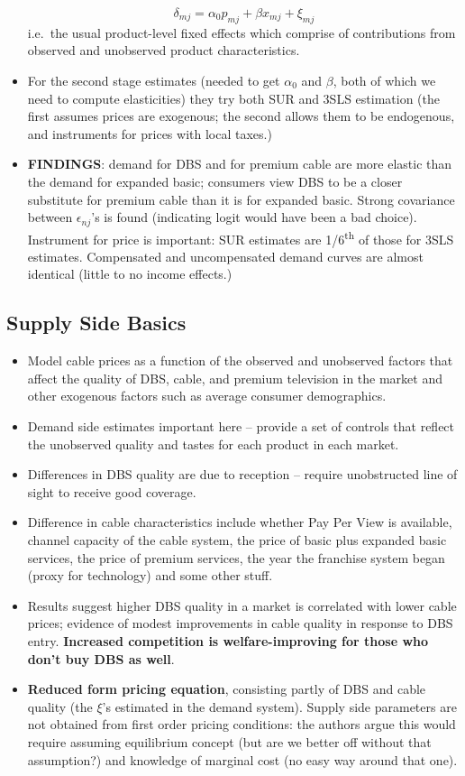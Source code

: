 \documentclass[11pt]{article}
\begin{document}
\begin{itemize}
		\begin{equation}
		\delta_{mj} = \alpha_0 p_{mj} +\beta x_{mj} + \xi_{mj}
		\end{equation}
		i.e.\ the usual product-level fixed effects which comprise of contributions from observed and unobserved product characteristics.
		\item For the second stage estimates (needed to get $\alpha_0$ and $\beta$, both of which we need to compute elasticities) they try both SUR and 3SLS estimation (the first assumes prices are exogenous; the second allows them to be endogenous, and instruments for prices with local taxes.)
		\item \textbf{FINDINGS}: demand for DBS and for premium cable are more elastic than the demand for expanded basic; consumers view DBS to be a closer substitute for premium cable than it is for expanded basic. Strong covariance between $\epsilon_{nj}$'s is found (indicating logit would have been a bad choice). Instrument for price is important: SUR estimates are 1/6\textsuperscript{th} of those for 3SLS estimates. Compensated and uncompensated demand curves are almost identical (little to no income effects.)
	\end{itemize}
\subsection{Supply Side Basics}
	\begin{itemize}
		\item Model cable prices as a function of the observed and unobserved factors that affect the quality of DBS, cable, and premium television in the market and other exogenous factors such as average consumer demographics.
		\item Demand side estimates important here -- provide a set of controls that reflect the unobserved quality and tastes for each product in each market.
		\item Differences in DBS quality are due to reception -- require unobstructed line of sight to receive good coverage.
		\item Difference in cable characteristics include whether Pay Per View is available, channel capacity of the cable system, the price of basic plus expanded basic services, the price of premium services, the year the franchise system began (proxy for technology) and some other stuff.
		\item Results suggest higher DBS quality in a market is correlated with lower cable prices; evidence of modest improvements in cable quality in response to DBS entry. \textbf{Increased competition is welfare-improving for those who don't buy DBS as well}.
		\item \textbf{Reduced form pricing equation}, consisting partly of DBS and cable quality (the $\xi$'s estimated in the demand system). Supply side parameters are not obtained from first order pricing conditions: the authors argue this would require assuming equilibrium concept (but are we better off without that assumption?) and knowledge of marginal cost (no easy way around that one).
	\end{itemize}
\end{document}
